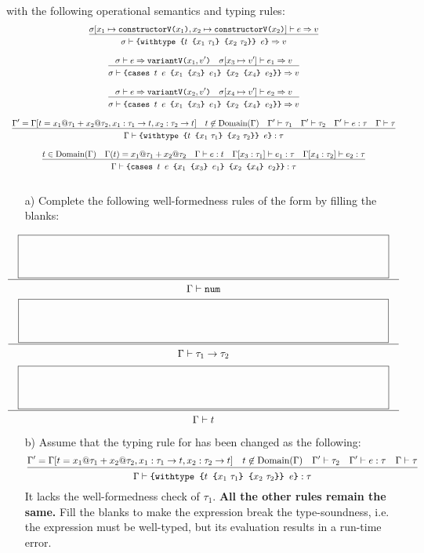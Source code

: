 \begin{enumerate}
with the following operational semantics and typing rules:
\[
\begin{array}{c}
\newinfrule
{ \sigma[x_1\mapsto\code{constructorV(}x_1\code{)},x_2\mapsto\code{constructorV(}x_2\code{)}]
\vdash e\Rightarrow v }
{ \sigma\vdash
\code{\{withtype \{}t\code{ \{}x_1\ \tau_1\code{\} \{}x_2\ \tau_2\code{\}\} }e\code{\}}
\Rightarrow v }
\\[20pt]
\newinfrule
{ \sigma\vdash e\Rightarrow\code{variantV(}x_1,v'\code{)} \rulesep
  \sigma[x_3\mapsto v']\vdash e_1\Rightarrow v }
{ \sigma\vdash
\code{\{cases } t\code{ }e\code{ \{}x_1\code{ \{}x_3\code{\} }e_1\code{\} \{}
x_2\code{ \{}x_4\code{\} }e_2\code{\}\}}
\Rightarrow v }
\\[20pt]
\newinfrule
{ \sigma\vdash e\Rightarrow\code{variantV(}x_2,v'\code{)} \rulesep
  \sigma[x_4\mapsto v']\vdash e_2\Rightarrow v }
{ \sigma\vdash
\code{\{cases } t\code{ }e\code{ \{}x_1\code{ \{}x_3\code{\} }e_1\code{\} \{}
x_2\code{ \{}x_4\code{\} }e_2\code{\}\}}
\Rightarrow v }
\\[20pt]
\newinfrule
{ \Gamma'=\Gamma[t=x_1@\tau_1+x_2@\tau_2,x_1:\tau_1\rightarrow t,x_2:\tau_2\rightarrow t]
  \rulesep t\not\in\mbox{Domain}(\Gamma) \rulesep \Gamma'\vdash\tau_1 \rulesep \Gamma'\vdash\tau_2
  \rulesep \Gamma'\vdash e:\tau \rulesep \Gamma\vdash\tau }
{ \Gamma\vdash
\code{\{withtype \{}t\code{ \{}x_1\ \tau_1\code{\} \{}x_2\ \tau_2\code{\}\} }e\code{\}}
:\tau }
\\[20pt]
\newinfrule
{ t\in\mbox{Domain}(\Gamma) \rulesep \Gamma(t)=x_1@\tau_1+x_2@\tau_2 \rulesep \typed{e}{t} \rulesep
  \Gamma[x_3:\tau_1]\vdash e_1:\tau \rulesep \Gamma[x_4:\tau_2]\vdash e_2:\tau }
{ \Gamma\vdash
\code{\{cases } t\code{ }e\code{ \{}x_1\code{ \{}x_3\code{\} }e_1\code{\} \{}
x_2\code{ \{}x_4\code{\} }e_2\code{\}\}}
:\tau }
\\[20pt]
\end{array}
\]

\begin{itemize}
\item[a)] Complete the following well-formedness rules
of the form \fbox{$\Gamma\vdash{\tau}$}
by filling the blanks:
\end{itemize}

{\Large
\[
\newinfrule
{ \lblank }
{ \Gamma\vdash{\code{num}} }
\]
\[
\newinfrule
{ \lblank }
{ \Gamma\vdash{\tau_1\rightarrow\tau_2} }
\]
\[
\newinfrule
{ \lblank }
{ \Gamma\vdash{t} }
\]
}
\begin{itemize}
\item[b)] Assume that the typing rule for  has been changed as the following:
\[
\newinfrule
{ \Gamma'=\Gamma[t=x_1@\tau_1+x_2@\tau_2,x_1:\tau_1\rightarrow t,x_2:\tau_2\rightarrow t]
  \rulesep t\not\in\mbox{Domain}(\Gamma) \rulesep \Gamma'\vdash\tau_2
  \rulesep \Gamma'\vdash e:\tau \rulesep \Gamma\vdash\tau }
{ \Gamma\vdash
\code{\{withtype \{}t\code{ \{}x_1\ \tau_1\code{\} \{}x_2\ \tau_2\code{\}\} }e\code{\}}
:\tau }
\]
It lacks the well-formedness check of $\tau_1$.
\textbf{All the other rules remain the same.}
Fill the blanks to make the expression break the type-soundness, i.e.
the expression must be well-typed, but its evaluation results in a run-time error.
\end{itemize}


\end{enumerate}

